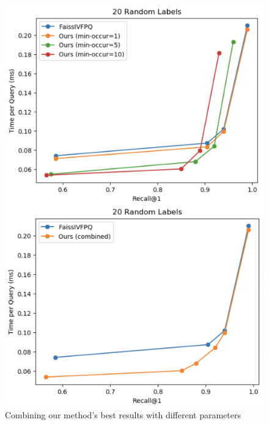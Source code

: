 \begin{figure}
    \centering
    \begin{minipage}[b]{.5\textwidth}
        \centering
        \includegraphics[width=.9\linewidth]{thesis/images/20random-all.png}
    \end{minipage}%
    \begin{minipage}[b]{.5\textwidth}
        \centering
        \includegraphics[width=.9\linewidth]{thesis/images/20random-combined.png}
    \end{minipage}
    \caption{Combining our method's best results with different parameters}
    \label{fig:20randomcomb}
\end{figure}



